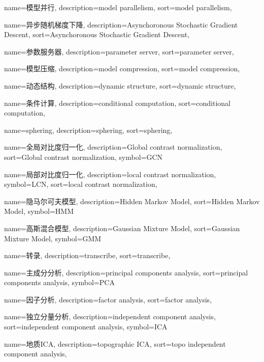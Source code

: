 {
  name=模型并行,
  description={model parallelism},
  sort={model parallelism},
}

{
  name=异步随机梯度下降,
  description={Asynchoronous Stochastic Gradient Descent},
  sort={Asynchoronous Stochastic Gradient Descent},
}

{
  name=参数服务器,
  description={parameter server},
  sort={parameter server},
}

{
  name=模型压缩,
  description={model compression},
  sort={model compression},
}

{
  name=动态结构,
  description={dynamic structure},
  sort={dynamic structure},
}

{
  name=条件计算,
  description={conditional computation},
  sort={conditional computation},
}

{
  name=sphering,
  description={sphering},
  sort={sphering},
}

{
  name=全局对比度归一化,
  description={Global contrast normalization},
  sort={Global contrast normalization},
  symbol={GCN}
}

{
  name=局部对比度归一化,
  description={local contrast normalization},
  symbol={LCN},
  sort={local contrast normalization},
}

{
  name=隐马尔可夫模型,
  description={Hidden Markov Model},
  sort={Hidden Markov Model},
  symbol={HMM}
}

{
  name=高斯混合模型,
  description={Gaussian Mixture Model},
  sort={Gaussian Mixture Model},
  symbol={GMM}
}

{
  name=转录,
  description={transcribe},
  sort={transcribe},
}

{
  name=主成分分析,
  description={principal components analysis},
  sort={principal components analysis},
  symbol={PCA}
}

{
  name=因子分析,
  description={factor analysis},
  sort={factor analysis},
}

{
  name=独立分量分析,
  description={independent component analysis},
  sort={independent component analysis},
  symbol={ICA}
}

{
  name=地质ICA,
  description={topographic ICA},
  sort={topo independent component analysis},
}

